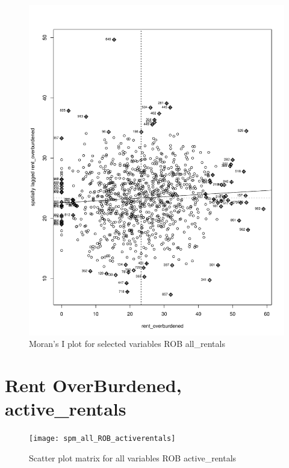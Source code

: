 \documentclass[10pt, letterpaper]{amsart}
\begin{document}
\begin{figure}[H]
  \caption{Moran's I plot for selected variables ROB all\_rentals}
  \includegraphics[scale=0.6]{Moran_ROB_allrentals}
\end{figure}

\newpage
\section{Rent OverBurdened, active\_rentals}

\begin{figure}[H]
  \caption{Scatter plot matrix for all variables ROB active\_rentals}
  \texttt{[image: spm\_all\_ROB\_activerentals]}
\end{figure}
\end{document}
